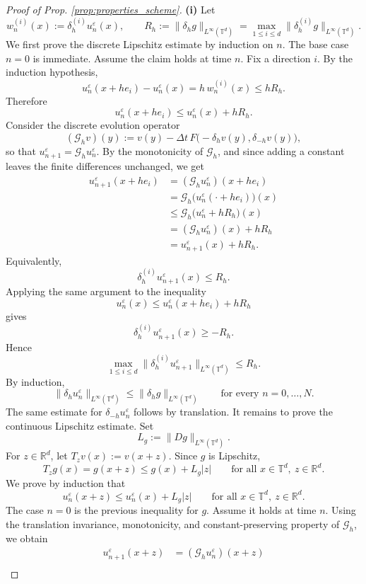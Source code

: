 \documentclass[11pt]{amsart}
\theoremstyle{remark}
\theoremstyle{definition}
\theoremstyle{Claim}
\newcommand{\T}{{\mathbb{T}}}
\newcommand{\R}{\mathbb{R}}
\theoremstyle{plain}
\begin{document}
\begin{proof}[Proof of Prop. \ref{prop:properties_scheme}]
\noindent\textbf{(i)}
Let
\[
w_n^{(i)}(x):=\delta_h^{(i)}u_n^\varepsilon(x),\qquad
R_h:=\|\delta_h g\|_{L^\infty(\T^d)}
=\max_{1\le i\le d}\|\delta_h^{(i)}g\|_{L^\infty(\T^d)} .
\]
We first prove the discrete Lipschitz estimate by induction on \(n\). The base case
\(n=0\) is immediate. Assume the claim holds at time \(n\). Fix a direction \(i\).
By the induction hypothesis,
\[
u_n^\varepsilon(x+h e_i)-u_n^\varepsilon(x)
=h\,w_n^{(i)}(x)\le hR_h .
\]
Therefore
\[
u_n^\varepsilon(x+h e_i)\le u_n^\varepsilon(x)+hR_h .
\]
Consider the discrete evolution operator
\[
(\mathcal G_h v)(y):=
v(y)-\Delta t\,F\big(-\delta_h v(y),\delta_{-h}v(y)\big),
\]
so that \(u_{n+1}^\varepsilon=\mathcal G_h u_n^\varepsilon\). By the monotonicity of
\(\mathcal G_h\), and since adding a constant leaves the finite differences unchanged, we get
\[
\begin{aligned}
u_{n+1}^\varepsilon(x+h e_i)
&=(\mathcal G_h u_n^\varepsilon)(x+h e_i)  \\
&=\mathcal G_h\big(u_n^\varepsilon(\cdot+h e_i)\big)(x) \\
&\le \mathcal G_h\big(u_n^\varepsilon+hR_h\big)(x) \\
&=(\mathcal G_h u_n^\varepsilon)(x)+hR_h \\
&=u_{n+1}^\varepsilon(x)+hR_h .
\end{aligned}
\]
Equivalently,
\[
\delta_h^{(i)}u_{n+1}^\varepsilon(x)\le R_h .
\]
Applying the same argument to the inequality
\[
u_n^\varepsilon(x)\le u_n^\varepsilon(x+h e_i)+hR_h
\]
gives
\[
\delta_h^{(i)}u_{n+1}^\varepsilon(x)\ge -R_h .
\]
Hence
\[
\max_{1\le i\le d}
\|\delta_h^{(i)}u_{n+1}^\varepsilon\|_{L^\infty(\T^d)}
\le R_h .
\]
By induction,
\[
\|\delta_h u_n^\varepsilon\|_{L^\infty(\T^d)}
\le \|\delta_h g\|_{L^\infty(\T^d)}
\qquad\text{for every }n=0,\ldots,N .
\]
The same estimate for \(\delta_{-h}u_n^\varepsilon\) follows by translation.
It remains to prove the continuous Lipschitz estimate. Set
\[
L_g:=\|Dg\|_{L^\infty(\T^d)} .
\]
For \(z\in\R^d\), let \(T_zv(x):=v(x+z)\). Since \(g\) is Lipschitz,
\[
T_zg(x)=g(x+z)\le g(x)+L_g|z|
\qquad\text{for all }x\in\T^d,\ z\in\R^d .
\]
We prove by induction that
\[
u_n^\varepsilon(x+z)\le u_n^\varepsilon(x)+L_g|z|
\qquad\text{for all }x\in\T^d,\ z\in\R^d .
\]
The case \(n=0\) is the previous inequality for \(g\). Assume it holds at time \(n\).
Using the translation invariance, monotonicity, and constant-preserving property of
\(\mathcal G_h\), we obtain
\[
\begin{aligned}
u_{n+1}^\varepsilon(x+z)
&=(\mathcal G_h u_n^\varepsilon)(x+z) \\

\end{aligned}\]
\end{proof}
\end{document}

